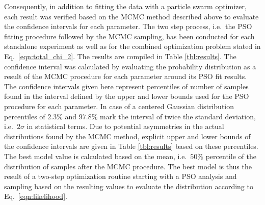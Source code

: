 Consequently, in addition to fitting the data with a particle swarm optimizer, each result was verified based on the MCMC method described above to evaluate the confidence intervals for each parameter. The two step process, i.e.~the PSO fitting procedure followed by the MCMC sampling, has been conducted for each standalone experiment as well as for the combined optimization problem stated in Eq.~\eqref{eqn:total_chi_2}. The results are compiled in Table \ref{tbl:results}. The confidence interval was calculated by evaluating the probability distribution as a result of the MCMC procedure for each parameter around its PSO fit results. The confidence intervals given here represent percentiles of number of samples found in the interval defined by the upper and lower bounds used for the PSO procedure for each parameter. In case of a centered Gaussian distribution percentiles of $2.3\%$ and $97.8\%$ mark the interval of twice the standard deviation, i.e.~$2\sigma$ in statistical terms. Due to potential asymmetries 
in the actual distributions found by the MCMC method, explicit upper and lower bounds of the confidence intervals are given in Table \ref{tbl:results} based on these percentiles. The best model value is calculated based on the mean, i.e.~$50\%$ percentile of the distribution of samples after the MCMC procedure. The best model is thus the result of a two-step optimization routine starting with a PSO analysis and sampling based on the resulting values to evaluate the distribution according to Eq.~\eqref{eqn:likelihood}.
\onecolumn
